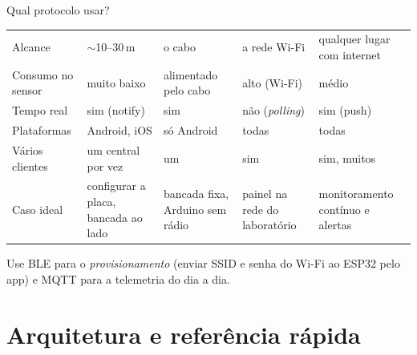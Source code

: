 \documentclass[aspectratio=169,10pt]{beamer}
\begin{document}
\begin{frame}{Qual protocolo usar?}
  \footnotesize
  \begin{tabularx}{\textwidth}{@{}l L L L L@{}}
    \toprule
    &  &  &  &  \\
    \midrule
    Alcance & $\sim$10--30\,m & o cabo & a rede Wi-Fi & qualquer lugar com internet \\
    Consumo no sensor & muito baixo & alimentado pelo cabo & alto (Wi-Fi) & médio \\
    Tempo real & sim (notify) & sim & não (\emph{polling}) & sim (push) \\
    Plataformas & Android, iOS & só Android & todas & todas \\
    Vários clientes & um central por vez & um & sim & sim, muitos \\
    Caso ideal & configurar a placa, bancada ao lado & bancada fixa, Arduino sem rádio & painel na rede do laboratório & monitoramento contínuo e alertas \\
    \bottomrule
  \end{tabularx}
  \vspace{4pt}
  \begin{dica}
    Use BLE para o \emph{provisionamento} (enviar SSID e senha do Wi-Fi ao ESP32 pelo app) e MQTT para a telemetria do dia a dia.
  \end{dica}
\end{frame}

\section{Arquitetura e referência rápida}
\end{document}
